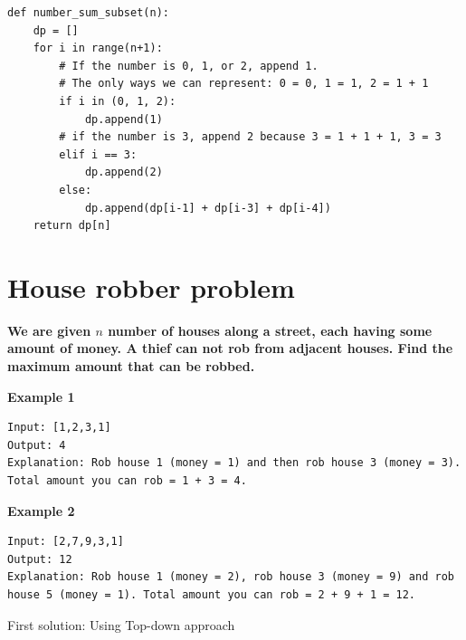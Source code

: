 \documentclass[a4paper,11pt]{book}
\begin{document}
\begin{lstlisting}
def number_sum_subset(n):
    dp = []
    for i in range(n+1):
        # If the number is 0, 1, or 2, append 1.
        # The only ways we can represent: 0 = 0, 1 = 1, 2 = 1 + 1
        if i in (0, 1, 2):
            dp.append(1)
        # if the number is 3, append 2 because 3 = 1 + 1 + 1, 3 = 3
        elif i == 3:
            dp.append(2)
        else:
            dp.append(dp[i-1] + dp[i-3] + dp[i-4])
    return dp[n]
\end{lstlisting}

\section{House robber problem}

\noindent \textbf{We are given $n$ number of houses along a street, each having some amount of money. A thief can not rob from adjacent houses. Find the maximum amount that can be robbed.}

\vspace{5mm}

\noindent \textbf{Example 1}
\begin{lstlisting}
Input: [1,2,3,1]
Output: 4
Explanation: Rob house 1 (money = 1) and then rob house 3 (money = 3). Total amount you can rob = 1 + 3 = 4.
\end{lstlisting}

\noindent \textbf{Example 2}
\begin{lstlisting}
Input: [2,7,9,3,1]
Output: 12
Explanation: Rob house 1 (money = 2), rob house 3 (money = 9) and rob house 5 (money = 1). Total amount you can rob = 2 + 9 + 1 = 12.
\end{lstlisting}


\noindent First solution: Using Top-down approach
\end{document}
